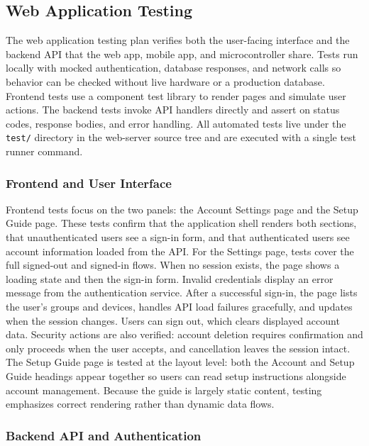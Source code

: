 \subsection{Web Application Testing}

The web application testing plan verifies both the user-facing interface and the backend API that the web app, mobile app, and microcontroller share. 
Tests run locally with mocked authentication, database responses, and network calls so behavior can be checked without live hardware or a production database. 
Frontend tests use a component test library to render pages and simulate user actions. The backend tests invoke API handlers directly and assert on status codes, response bodies, and error handling. 
All automated tests live under the \texttt{test/} directory in the web-server source tree and are executed with a single test runner command.

\subsubsection{Frontend and User Interface}

Frontend tests focus on the two panels: the Account Settings page and the Setup Guide page. These tests confirm that the application shell renders both sections, 
that unauthenticated users see a sign-in form, and that authenticated users see account information loaded from the API.
For the Settings page, tests cover the full signed-out and signed-in flows. When no session exists, the page shows a loading state and then the sign-in form.
Invalid credentials display an error message from the authentication service. After a successful sign-in, the page lists the user's groups and devices, 
handles API load failures gracefully, and updates when the session changes. Users can sign out, which clears displayed account data. 
Security actions are also verified: account deletion requires confirmation and only proceeds when the user accepts, and cancellation leaves the session intact.
The Setup Guide page is tested at the layout level: both the Account and Setup Guide headings appear together so users can read setup instructions alongside account management. 
Because the guide is largely static content, testing emphasizes correct rendering rather than dynamic data flows.

\subsubsection{Backend API and Authentication}

